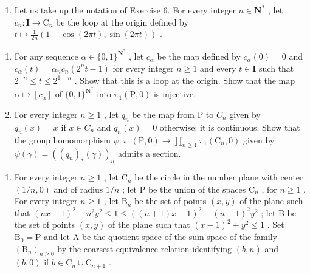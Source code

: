 \begin{enumerate}
\def\labelenumi{\arabic{enumi})}
\setcounter{enumi}{8}
\tightlist
\item
  Let us take up the notation of Exercise 6. For every integer \(n \in \mathbf{N}^*\) , let \(c_n: \mathbf{I} \to \mathrm{C}_n\) be the loop at the origin defined by \(t \mapsto \frac{1}{2n}(1 - \cos(2\pi t), \sin(2\pi t))\) .\\
\end{enumerate}

\begin{enumerate}
\def\labelenumi{\alph{enumi})}
\item
  For any sequence \(\alpha \in \{0,1\}^{\mathbf{N}^*}\) , let \(c_\alpha\) be the map defined by \(c_\alpha(0) = 0\) and \(c_\alpha(t) = \alpha_n c_n (2^n t - 1)\) for every integer \(n \geqslant 1\) and every \(t \in \mathbf{I}\) such that \(2^{-n} \leqslant t \leqslant 2^{1-n}\) . Show that this is a loop at the origin. Show that the map \(\alpha \mapsto [c_\alpha]\) of \(\{0,1\}^{\mathbf{N}^*}\) into \(\pi_1(\mathrm{P},0)\) is injective.
\item
  For every integer \(n \geqslant 1\) , let \(q_{n}\) be the map from P to \(C_{n}\) given by \(q_{n}(x) = x\) if \(x \in C_{n}\) and \(q_{n}(x) = 0\) otherwise; it is continuous. Show that the group homomorphism \(\psi: \pi_{1}(\mathrm{P}, 0) \to \prod_{n \geqslant 1} \pi_{1}(\mathrm{C}_{n}, 0)\) given by \(\psi(\gamma) = ((q_{n})_{*}(\gamma))_{n}\) admits a section.
\end{enumerate}

\begin{enumerate}
\def\labelenumi{\arabic{enumi})}
\setcounter{enumi}{9}
\tightlist
\item
  For every integer \(n \geqslant 1\) , let \(\mathrm{C}_n\) be the circle in the number plane with center \((1/n,0)\) and of radius \(1/n\) ; let P be the union of the spaces \(\mathrm{C}_n\) , for \(n \geqslant 1\) . For every integer \(n \geqslant 1\) , let \(\mathrm{B}_n\) be the set of points \((x,y)\) of the plane such that \((nx-1)^2 + n^2y^2 \leqslant 1 \leqslant ((n+1)x-1)^2 + (n+1)^2y^2\) ; let B be the set of points \((x,y)\) of the plane such that \((x-1)^2 + y^2 \leqslant 1\) . Set \(\mathrm{B}_0 = \mathrm{P}\) and let A be the quotient space of the sum space of the family \((\mathrm{B}_n)_{n \geqslant 0}\) by the coarsest equivalence relation identifying \((b,n)\) and \((b,0)\) if \(b \in \mathrm{C}_n \cup \mathrm{C}_{n+1}\) .
\end{enumerate}

